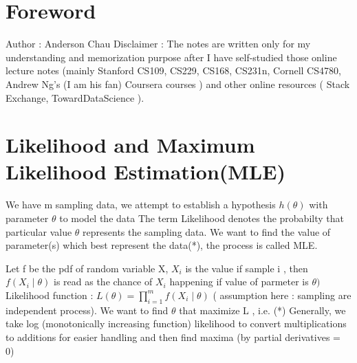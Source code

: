 \documentclass{article}
\begin{document}
\section{Foreword}
Author : Anderson Chau
\newline 
\newline 
Disclaimer : The notes are written only for my understanding and memorization purpose after I have self-studied those online lecture notes (mainly Stanford CS109, CS229, CS168, CS231n, Cornell CS4780, Andrew Ng's (I am his fan) Coursera courses ) and other online resources ( Stack Exchange, TowardDataScience ).

\section{Likelihood and Maximum Likelihood Estimation(MLE)}
We have m sampling data, we attempt to establish a hypothesis \(h(\theta)\) with parameter \(\theta\) to model the data \newline
The term Likelihood denotes the probabilty that particular value \(\theta\) represents the sampling data.\newline 
We want to find the value of parameter(s) which best represent the data(*), the process is called MLE. \newline 

Let f be the pdf of random variable X, \(X_i\) is the value if sample i ,  then \(f(X_i \mid \theta)\) is read as the chance of \(X_i\) happening if value of parmeter is \(\theta)\) \newline  \newline 
Likelihood function : \(L(\theta) = \prod_{i=1}^{m} f(X_i \mid \theta)\) ( assumption here : sampling are independent process). We want to find \(\theta\) that maximize  L , i.e. (*) \newline
Generally, we take log (monotonically increasing function) likelihood to convert multiplications to additions for easier handling  and then find maxima (by partial derivatives = 0) 
\end{document}
